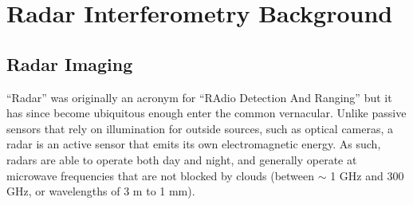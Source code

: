 
\chapter{Radar Interferometry Background}
\label{CHAP:2}




\section{Radar Imaging}
\label{sec:ch2-radar}

``Radar'' was originally an acronym for ``RAdio Detection And Ranging'' but it has since become ubiquitous enough enter the common vernacular. Unlike passive sensors that rely on illumination for outside sources, such as optical cameras, a radar is an active sensor that emits its own electromagnetic energy.  As such, radars are able to operate both day and night, and generally operate at microwave frequencies that are not blocked by clouds (between $\sim$ 1 GHz and 300 GHz, or wavelengths of 3 m to 1 mm).

